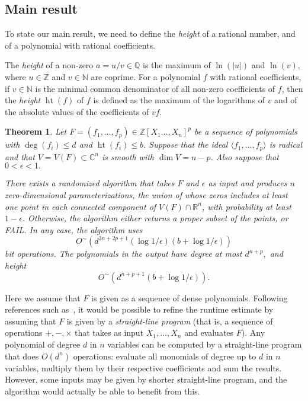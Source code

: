 \documentclass[a4paper]{article}
\DeclareMathOperator{\htt}{ht}
\newcommand{\ZZ}{{\mathbb{Z}}}
\def\C{\mathbb{C}}
\def\Q{\mathbb{Q}}
\def\R{\mathbb{R}}
\newtheorem{theorem}{Theorem}[section]
\begin{document}
\subsection{Main result} To state our main result, we need to define 
the {\em height} of a rational number, and of a polynomial with
rational coefficients.

The {\em height} of a non-zero $a=u/v \in \Q$ is the maximum of
$\ln(|u|)$ and $\ln(v),$ where $u \in \mathbb{Z}$ and $v \in
\mathbb{N}$ are coprime. For a polynomial $f$ with rational
coefficients, if $v \in \mathbb N$ is the minimal common denominator
of all non-zero coefficients of $f$, then the \textit{height}
$\htt(f)$ of $f$ is defined as the maximum of the logarithms of $v$
and of the absolute values of the coefficients of $vf$.
%
%
\begin{theorem}\label{theo:main}
  Let $F= (f_1,\hdots,f_p)\in\ZZ[X_1\hdots,X_n]^p$ be a sequence of polynomials with $\deg(f_i) \leq d$ and $\htt(f_i) \leq b$. Suppose that the ideal $\langle f_1,\hdots, f_p \rangle $ is radical and that $V=V(F) \subset \C^n$ is 
  smooth with $\dim V = n-p$. Also suppose that $0 < \epsilon < 1.$

  There exists a randomized algorithm that takes $F$ and $\epsilon$ as input and produces $n$ zero-dimensional parameterizations, the union
  of whose zeros includes at least one point in each connected
  component of $V(F) \cap \R^n$, with probability at least
  $1-\epsilon$. Otherwise, the algorithm either returns a proper
  subset of the points, or FAIL.  In any case, the algorithm uses
  \[
O^{\sim}(d^{3n+2p+1}(\log1/\epsilon)(b + \log1/\epsilon))
  \]
  bit operations. The polynomials in
  the output have degree at most $d^{n+p},$ and height 
  \[
O^{\sim}(d^{n+p+1}(b + \log1/\epsilon)).
  \]
\end{theorem}
%
%
\noindent 
Here we assume that $F$ is given as a sequence of dense polynomials.  Following
references such
as~\cite{GiHeMoPa95,GiHaHeMoMoPa97,GiHeMoMoPa98,BaGiHeMb97,EMP}, it
would be possible to refine the runtime estimate by assuming that $F$
is given by a {\em straight-line program} (that is, a sequence of
operations $+,-,\times$ that takes as input $X_1,\dots,X_n$ and
evaluates $F$). Any polynomial of degree $d$ in $n$ variables can be computed by a straight-line program that does $O(d^n)$ operations: evaluate all monomials of degree up to $d$ in $n$ variables, multiply them by their respective coefficients and sum the results. However, some inputs may be given by shorter straight-line program, and the algorithm would actually be able to benefit from this. 
\end{document}
